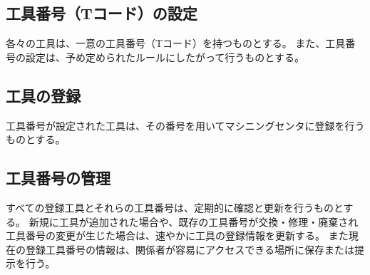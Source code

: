 



\subsection{工具番号（Tコード）の設定}
各々の工具は、一意の工具番号（Tコード）を持つものとする。
また、工具番号の設定は、予め定められたルールにしたがって行うものとする。

\subsection{工具の登録}
工具番号が設定された工具は、その番号を用いてマシニングセンタに登録を行うものとする。

\subsection{工具番号の管理}
すべての登録工具とそれらの工具番号は、定期的に確認と更新を行うものとする。
新規に工具が追加された場合や、既存の工具番号が交換・修理・廃棄され工具番号の変更が生じた場合は、速やかに工具の登録情報を更新する。
また現在の登録工具番号の情報は、関係者が容易にアクセスできる場所に保存または提示を行う。



